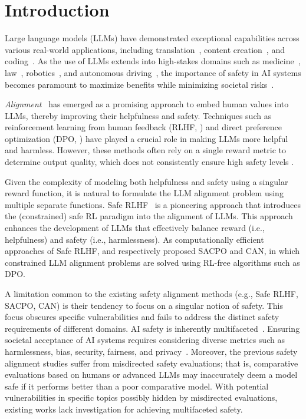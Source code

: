 \section{Introduction}
\label{sec:intro}

Large language models (LLMs) have demonstrated exceptional capabilities across various real-world applications, including translation~\citep{zhang2023prompting}, content creation~\citep{yuan2022wordcraft}, and coding~\citep{chen2021evaluating,gao2023pal}. As the use of LLMs extends into high-stakes domains such as medicine~\citep{thirunavukarasu2023large}, law~\citep{cui2023chatlaw}, robotics~\citep{shah2023lm}, and autonomous driving~\citep{chen2023driving}, the importance of safety in AI systems becomes paramount to maximize benefits while minimizing societal risks~\citep{gehman2020realtoxicityprompts,lin2021truthfulqa,liu2023trustworthy}.

\textit{Alignment}~\citep{ji2023ai} has emerged as a promising approach to embed human values into LLMs, thereby improving their helpfulness and safety. Techniques such as reinforcement learning from human feedback (RLHF, \citet{christiano2017deep,ouyang2022training}) and direct preference optimization (DPO, \citet{rafailov2023direct}) have played a crucial role in making LLMs more helpful and harmless. However, these methods often rely on a single reward metric to determine output quality, which does not consistently ensure high safety levels \citep{dai2024safe}. 

Given the complexity of modeling both helpfulness and safety using a singular reward function, it is natural to formulate the LLM alignment problem using multiple separate functions. Safe RLHF~\citep{dai2024safe} is a pioneering approach that introduces the (constrained) safe RL paradigm into the alignment of LLMs. This approach enhances the development of LLMs that effectively balance reward (i.e., helpfulness) and safety (i.e., harmlessness). As computationally efficient approaches of Safe RLHF, \citet{wachi2024stepwise} and \citet{huang2024one} respectively proposed SACPO and CAN, in which constrained LLM alignment problems are solved using RL-free algorithms such as DPO.

A limitation common to the existing safety alignment methods (e.g., Safe RLHF, SACPO, CAN) is their tendency to focus on a singular notion of safety. This focus obscures specific vulnerabilities and fails to address the distinct safety requirements of different domains. AI safety is inherently multifaceted~\citep{amodei2016concrete,bostrom2018ethics}. Ensuring societal acceptance of AI systems requires considering diverse metrics such as harmlessness, bias, security, fairness, and privacy~\citep{wang2023decodingtrust}. Moreover, the previous safety alignment studies \citep{dai2024safe,wachi2024stepwise,huang2024one} suffer from misdirected safety evaluations; that is,
comparative evaluations based on humans or advanced LLMs may inaccurately deem a model safe if it performs better than a poor comparative model.
With potential vulnerabilities in specific topics possibly hidden by misdirected evaluations, existing works lack investigation for achieving multifaceted safety.


